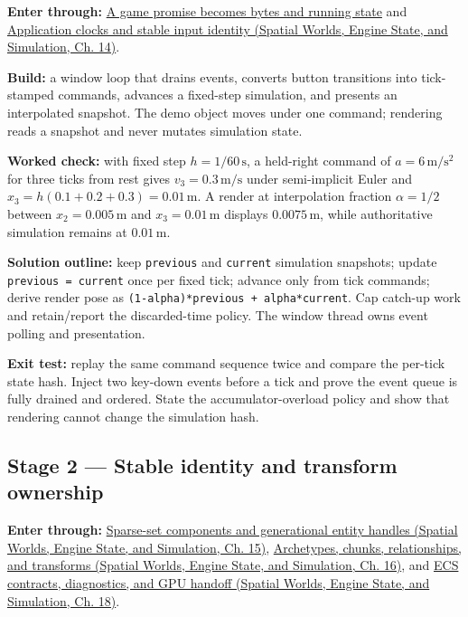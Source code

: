 \hypertarget{06-engine-ii-ch042-stage-1-a-visible-repeatable-frame}{}

\textbf{Enter through:} \hyperref[05-engine-i-ch002-where-the-bytes-live]{A game promise becomes bytes and running state} and \href{../05-Spatial-Worlds-Engine-State-and-Simulation/main.pdf\#nameddest=05-engine-i-ch014-keep-application-key-names-independent-of-a-windowing-library}{Application clocks and stable input identity (Spatial Worlds, Engine State, and Simulation, Ch. 14)}.

\textbf{Build:} a window loop that drains events, converts button transitions into tick-stamped commands, advances a fixed-step simulation, and presents an interpolated snapshot. The demo object moves under one command; rendering reads a snapshot and never mutates simulation state.

\textbf{Worked check:} with fixed step \(h=1/60\,\mathrm s\), a held-right command of \(a=6\,\mathrm{m/s^2}\) for three ticks from rest gives \(v_3=0.3\,\mathrm{m/s}\) under semi-implicit Euler and \(x_3=h(0.1+0.2+0.3)=0.01\,\mathrm m\). A render at interpolation fraction \(\alpha=1/2\) between \(x_2=0.005\,\mathrm m\) and \(x_3=0.01\,\mathrm m\) displays \(0.0075\,\mathrm m\), while authoritative simulation remains at \(0.01\,\mathrm m\).

\textbf{Solution outline:} keep \texttt{previous} and \texttt{current} simulation snapshots; update \texttt{previous\ =\ current} once per fixed tick; advance only from tick commands; derive render pose as \texttt{(1-alpha)*previous\ +\ alpha*current}. Cap catch-up work and retain/report the discarded-time policy. The window thread owns event polling and presentation.

\textbf{Exit test:} replay the same command sequence twice and compare the per-tick state hash. Inject two key-down events before a tick and prove the event queue is fully drained and ordered. State the accumulator-overload policy and show that rendering cannot change the simulation hash.

\subsection{Stage 2 --- Stable identity and transform ownership}\label{06-engine-ii-ch042-stage-2-stable-identity-and-transform-ownership}

\hypertarget{06-engine-ii-ch042-stage-2-stable-identity-and-transform-ownership}{}

\textbf{Enter through:} \href{../05-Spatial-Worlds-Engine-State-and-Simulation/main.pdf\#nameddest=05-engine-i-ch015-component-pools-and-sparse-sets}{Sparse-set components and generational entity handles (Spatial Worlds, Engine State, and Simulation, Ch. 15)}, \href{../05-Spatial-Worlds-Engine-State-and-Simulation/main.pdf\#nameddest=05-engine-i-ch016-archetypes-chunks-layouts-relationships-and-transforms}{Archetypes, chunks, relationships, and transforms (Spatial Worlds, Engine State, and Simulation, Ch. 16)}, and \href{../05-Spatial-Worlds-Engine-State-and-Simulation/main.pdf\#nameddest=05-engine-i-ch018-diagnostics-memory-complexity-api-contracts-and-complete-ecs-defense}{ECS contracts, diagnostics, and GPU handoff (Spatial Worlds, Engine State, and Simulation, Ch. 18)}.

